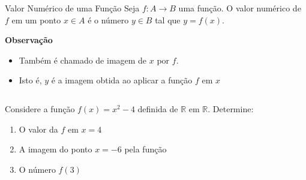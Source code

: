 \begin{frame}
  \begin{definition}{Valor Numérico de uma Função}
    Seja $f:A\rightarrow B$ uma função. O valor numérico de $f$ em um ponto $x\in A$ é o número $y\in B$ tal que $y=f(x)$.
    
    \textbf{Observação}
    \begin{itemize}
      \item Também é chamado de imagem de $x$ por $f$.
      \item Isto é, $y$ é a imagem obtida ao aplicar a função $f$ em $x$
    \end{itemize}
  \end{definition}
  \begin{columns}[onlytextwidth]
    \begin{column}{0.48\textwidth}
      \begin{example-highlight}
        Considere a função $f(x) = x^2 - 4$ definida de $\mathbb{R}$ em $\mathbb{R}$. Determine:
        \begin{enumerate}
          \item O valor da $f$ em $x=4$
          \item A imagem do ponto $x=-6$ pela função
          \item O número $f(3)$
        \end{enumerate}
      \end{example-highlight}
    \end{column}
    \begin{column}{0.48\textwidth}
    \end{column}
  \end{columns}
\end{frame}

